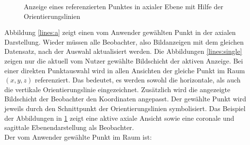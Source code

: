 \begin{figure}[htb]
\centering
{}
\caption{Anzeige eines referenzierten Punktes in axialer Ebene mit Hilfe der Orientierungslinien}
\label{lines}
\end{figure}

Abbildung \ref{lines:a} zeigt einen vom Anwender gewählten Punkt in der axialen Darstellung. Wieder müssen alle Beobachter, also Bildanzeigen mit dem gleichen Datensatz, nach der Auswahl aktualisiert werden. Die Abbildungen \ref{lines:single} zeigen nur die aktuell vom Nutzer gewählte Bildschicht der aktiven Anzeige. Bei einer direkten Punktauswahl wird in allen Ansichten der gleiche Punkt im Raum $(x, y, z)$ referenziert. Das bedeutet, es werden sowohl die horizontale, als auch die vertikale Orientierungslinie eingezeichnet. Zusätzlich wird die angezeigte Bildschicht der Beobachter den Koordinaten angepasst. Der gewählte Punkt wird jeweils durch den Schnittpunkt der Orientierungslinien symbolisiert. Das Beispiel der Abbildungen in \ref{lines} zeigt eine aktive axiale Ansicht sowie eine coronale und sagittale Ebenendarstellung als Beobachter.\\
Der vom Anwender gewählte Punkt im Raum ist:

